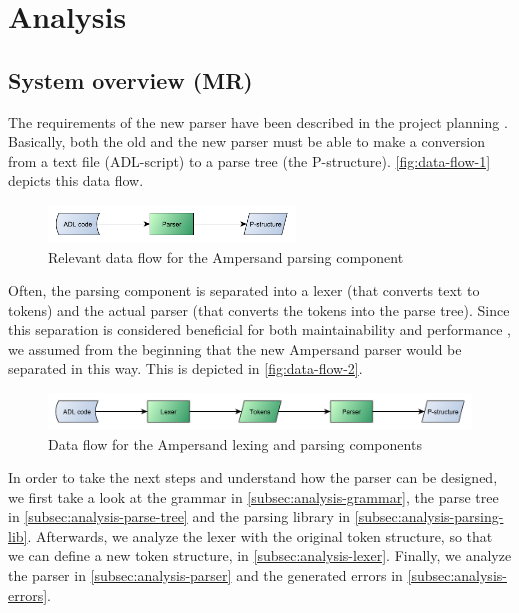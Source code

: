 
\section{Analysis}
\label{sec:analysis}

\subsection{System overview (MR)}
The requirements of the new parser have been described in the project planning .
Basically, both the old and the new parser must be able to make a conversion from a text file (ADL-script) to a parse tree (the P-structure).
\autoref{fig:data-flow-1} depicts this data flow.
%
\begin{figure}[htb!]
	\centering
	\includegraphics[width=0.586\textwidth]{Figures/DataFlow1}
	\caption{Relevant data flow for the Ampersand parsing component}
	\label{fig:data-flow-1}
\end{figure}

Often, the parsing component is separated into a lexer (that converts text to tokens) and the actual parser (that converts the tokens into the parse tree).
Since this separation is considered beneficial for both maintainability and performance , we assumed from the beginning that the new Ampersand parser would be separated in this way.
This is depicted in \autoref{fig:data-flow-2}.
%
\begin{figure}[htb!]
	\centering
	\includegraphics[width=1\textwidth]{Figures/DataFlow2}
	\caption{Data flow for the Ampersand lexing and parsing components}
	\label{fig:data-flow-2}
\end{figure}

In order to take the next steps and understand how the parser can be designed, we first take a look at the grammar in \autoref{subsec:analysis-grammar}, the parse tree in \autoref{subsec:analysis-parse-tree} and the parsing library in \autoref{subsec:analysis-parsing-lib}.
Afterwards, we analyze the lexer with the original token structure, so that we can define a new token structure, in \autoref{subsec:analysis-lexer}.
Finally, we analyze the parser in \autoref{subsec:analysis-parser} and the generated errors in \autoref{subsec:analysis-errors}.

